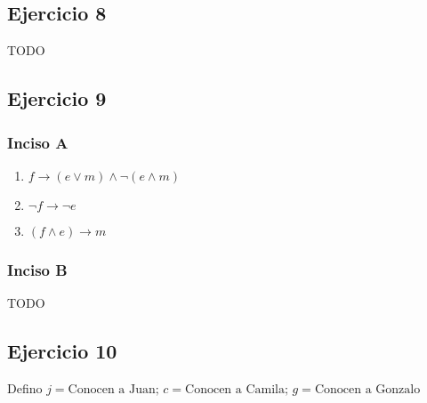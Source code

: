 \subsection{Ejercicio 8}
TODO

\subsection{Ejercicio 9}
\subsubsection{Inciso A}

\begin{enumerate}[label=(\alph*)]
    \item $f \rightarrow (e \vee m) \wedge \neg (e \wedge m)$
    \item $\neg f \rightarrow \neg e$
    \item $(f\wedge e) \rightarrow m$
\end{enumerate}

\subsubsection{Inciso B}
TODO

\subsection{Ejercicio 10}

Defino $j = \text{Conocen a Juan; } c = \text{Conocen a Camila; } g = \text{Conocen a Gonzalo}$ \\

